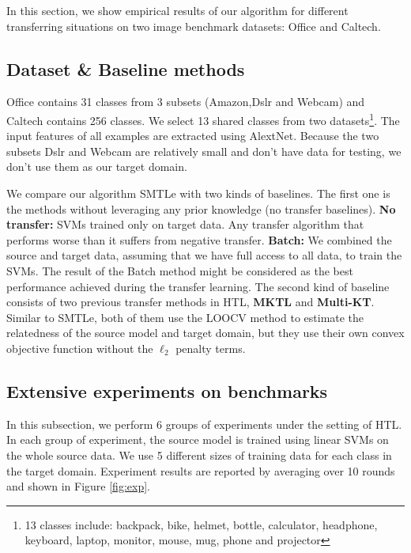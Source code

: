 In this section, we show empirical results of our algorithm for different transferring situations on two image benchmark datasets: Office and Caltech.
\subsection{Dataset \& Baseline methods}
Office contains 31 classes from 3 subsets (Amazon,Dslr and Webcam) and Caltech contains 256 classes. We select 13 shared classes from two datasets\footnote{13 classes include: backpack, bike, helmet, bottle, calculator, headphone, keyboard, laptop, monitor, mouse, mug, phone and projector}. The input features of all examples are extracted using AlextNet\cite{krizhevsky2012imagenet}.
Because the two subsets Dslr and Webcam are relatively small and don't have data for testing, we don't use them as our target domain.

We compare our algorithm SMTLe with two kinds of baselines. The first one is the methods without leveraging any prior knowledge (no transfer baselines). \textbf{No transfer:} SVMs trained only on target data. Any transfer algorithm that performs worse than it suffers from negative transfer. \textbf{Batch:} We combined the source and target data, assuming that we have full access to all data, to train the SVMs. The result of the Batch method might be considered as the best performance achieved during the transfer learning. The second kind of baseline consists of two previous transfer methods in HTL, \textbf{MKTL\cite{jie2011multiclass}} and \textbf{Multi-KT\cite{tommasi2014learning}}. Similar to SMTLe, both of them use the LOOCV method to estimate the relatedness of the source model and target domain, but they use their own convex objective function without the $\ell_2$ penalty terms. 
\subsection{Extensive experiments on benchmarks}
In this subsection, we perform 6 groups of experiments under the setting of HTL. In each group of experiment, the source model is trained using linear SVMs on the whole source data. We use 5 different sizes of training data for each class in the target domain. Experiment results are reported by averaging over 10 rounds and shown in Figure \ref{fig:exp}. 

